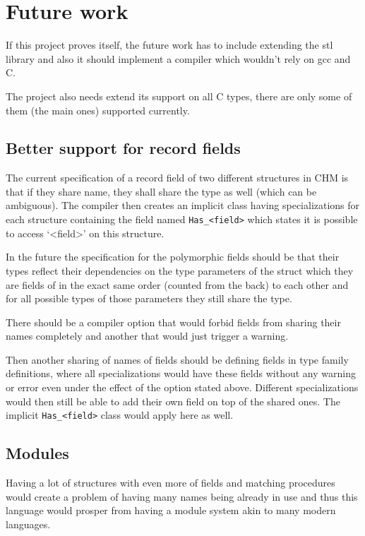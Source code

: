 \section{Future work}

If this project proves itself, the future work has to include extending the stl library and also it should implement a compiler which wouldn't rely on gcc and C.

The project also needs extend its support on all C types, there are only some of them (the main ones) supported currently.

\subsection{Better support for record fields}

The current specification of a record field of two different structures in CHM is that if they share name, they shall share the type as well (which can be ambiguous). The compiler then creates an implicit class having specializations for each structure containing the field named \lstinline{Has_<field>} which states it is possible to access `<field>' on this structure.

In the future the specification for the polymorphic fields should be that their types reflect their dependencies on the type parameters of the struct which they are fields of in the exact same order (counted from the back) to each other and for all possible types of those parameters they still share the type.

There should be a compiler option that would forbid fields from sharing their names completely and another that would just trigger a warning.

Then another sharing of names of fields should be defining fields in type family definitions, where all specializations would have these fields without any warning or error even under the effect of the option stated above. Different specializations would then still be able to add their own field on top of the shared ones. The implicit \lstinline{Has_<field>} class would apply here as well.

\subsection{Modules}

Having a lot of structures with even more of fields and matching procedures would create a problem of having many names being already in use and thus this language would prosper from having a module system akin to many modern languages.


